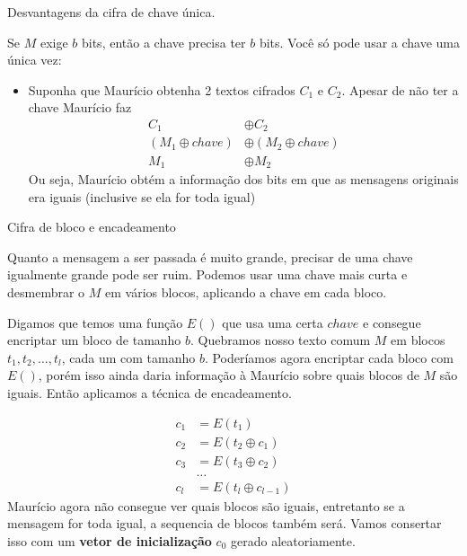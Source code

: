 \begin{frame}{}{}
Desvantagens da cifra de chave única.
\begin{itemize}
\pitem Se $M$ exige $b$ bits, então a chave precisa ter $b$ bits.
\pitem Você só pode usar a chave uma única vez:
\begin{itemize}
\item Suponha que Maurício obtenha 2 textos cifrados $C_1$ e $C_2$.
\pitem Apesar de não ter a chave Maurício faz 
\begin{align}
C_1 &\oplus C_2 \\
(M_1 \oplus chave) & \oplus (M_2 \oplus chave) \\
M_1 & \oplus M_2 
\end{align}
\pitem Ou seja, Maurício obtém a informação dos bits em que as mensagens originais era iguais (inclusive se ela for toda igual)
\end{itemize}
\end{itemize}
\end{frame}



\begin{frame}{Cifra de bloco e encadeamento}{}
\begin{itemize}
\pitem Quanto a mensagem a ser passada é muito grande, precisar de uma chave igualmente grande pode ser ruim.
\pitem Podemos usar uma chave mais curta e desmembrar o $M$ em vários blocos, aplicando a chave em cada bloco.
\end{itemize}
\end{frame}

\begin{frame}{}{}
\begin{itemize}
\pitem Digamos que temos uma função $E()$ que usa uma certa $chave$ e consegue encriptar um bloco de tamanho $b$.
\pitem Quebramos nosso texto comum $M$ em blocos $t_1, t_2, \ldots, t_l$, cada um com tamanho $b$.
\pitem Poderíamos agora encriptar cada bloco com $E()$, porém isso ainda daria informação à Maurício sobre quais blocos de $M$ são iguais.
\pitem Então aplicamos a técnica de encadeamento.
\end{itemize}
\end{frame}




\begin{frame}{}{}
\begin{align}
c_1 & = E(t_1)\\
c_2 & = E(t_2 \oplus c_1)\\
c_3 & = E(t_3 \oplus c_2)\\
& \ldots \\
c_l & = E(t_l \oplus c_{l-1})
\end{align}
\ppause 
Maurício agora não consegue ver quais blocos são iguais, entretanto se a mensagem for toda igual, a sequencia de blocos também será. Vamos consertar isso com um {\bf vetor de inicialização} $c_0$ gerado aleatoriamente.
\end{frame}



